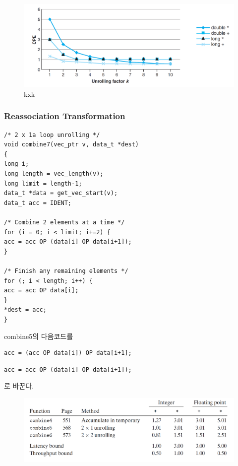 \begin{figure}[h!]
    \centering
    \includegraphics[scale=0.3]{pic/section5/pic8}
    \caption{kxk}
\end{figure}


\subsubsection{Reassociation Transformation}


\begin{lstlisting}[style = CStyle]
/* 2 x 1a loop unrolling */
void combine7(vec_ptr v, data_t *dest)
{
long i;
long length = vec_length(v);
long limit = length-1;
data_t *data = get_vec_start(v);
data_t acc = IDENT;

/* Combine 2 elements at a time */
for (i = 0; i < limit; i+=2) {
acc = acc OP (data[i] OP data[i+1]);
}

/* Finish any remaining elements */
for (; i < length; i++) {
acc = acc OP data[i];
}
*dest = acc;
}
\end{lstlisting}

combine5의 다음코드를


\begin{lstlisting}[style = CStyle]
    acc = (acc OP data[i]) OP data[i+1];
\end{lstlisting}


\begin{lstlisting}[style = CStyle]
    acc = acc OP (data[i] OP data[i+1]);
\end{lstlisting}
로 바꾼다.

\begin{figure}[h!]
    \centering
    \includegraphics[scale=0.3]{pic/section5/pic7}
    \caption{}
\end{figure}



